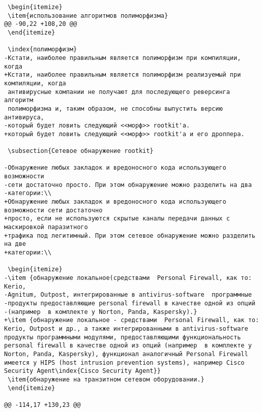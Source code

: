 \begin{verbatim}
 \begin{itemize}
 \item{использование алгоритмов полиморфизма}
@@ -90,22 +108,20 @@
 \end{itemize}

 \index{полиморфизм}
-Кстати, наиболее правильным является полиморфизм при компиляции, когда
+Кстати, наиболее правильным является полиморфизм реализуемый при компиляции, когда
 антивирусные компании не получают для последующего реверсинга алгоритм
 полиморфизма и, таким образом, не способны выпустить версию антивируса,
-который будет ловить следующий <<морф>> rootkit'а.
+который будет ловить следующий <<морф>> rootkit'а и его дроппера.

 \subsection{Сетевое обнаружение rootkit}

-Обнаружение любых закладок и вредоносного кода использующего возможности
-сети достаточно просто. При этом обнаружение можно разделить на два
-категории:\\
+Обнаружение любых закладок и вредоносного кода использующего возможности сети достаточно
+просто, если не используются скрытые каналы передачи данных с маскировкой паразитного
+трафика под легитимный. При этом сетевое обнаружение можно разделить на две
+категории:\\

 \begin{itemize}
-\item {обнаружение локальное(средствами  Personal Firewall, как то: Kerio,
-Agnitum, Outpost, интегрированные в antivirus-software  программные
-продукты предоставляющие personal firewall в качестве одной из опций
-(например  в комплекте у Norton, Panda, Kaspersky).}
+\item {обнаружение локальное - средствами  Personal Firewall, как то: Kerio, Outpost и др., а также интегрированными в antivirus-software продукты программными модулями, предоставляющими функциональность personal firewall в качестве одной из опций (например  в комплекте у Norton, Panda, Kaspersky), функционал аналогичный Personal Firewall имеется у HIPS (host intrusion prevention systems), например Cisco Security Agent\index{Cisco Security Agent}}
 \item{обнаружение на транзитном сетевом оборудовании.}
 \end{itemize}

@@ -114,17 +130,23 @@


\end{verbatim}
